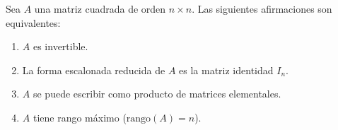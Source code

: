 \begin{theorem}\label{thm:invertible-equiv}
Sea $A$ una matriz cuadrada de orden $n \times n$. Las siguientes afirmaciones son equivalentes:
\begin{enumerate}
    \item $A$ es invertible.
    \item La forma escalonada reducida de $A$ es la matriz identidad $I_n$.
    \item $A$ se puede escribir como producto de matrices elementales.
    \item $A$ tiene rango máximo ($\text{rango}(A) = n$).
\end{enumerate}
\end{theorem}

